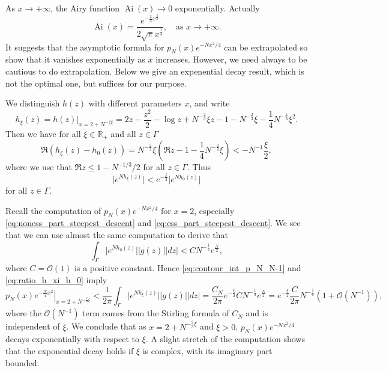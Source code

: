 \documentclass[11pt, a4paper]{article}
\numberwithin{equation}{section}
\newcommand{\bigO}{\mathcal{O}}
\newcommand{\realR}{\mathbb{R}}
\DeclareMathOperator{\Ai}{Ai}
\theoremstyle{definition}
\theoremstyle{remark}
\begin{document}
As $x \to +\infty$, the Airy function $\Ai(x) \to 0$ exponentially. Actually
\begin{equation}
  \Ai(x) = \frac{e^{-\frac{2}{3} x^{\frac{3}{2}}}}{2 \sqrt{\pi} x^{\frac{1}{4}}}, \quad \text{as $x \to +\infty$}.
\end{equation}
It suggests that the asymptotic formula for $p_N(x) e^{-Nx^2/4}$ can be extrapolated so show that it vanishes exponentially as $x$ increases. However, we need always to be cautious to do extrapolation. Below we give an expenential decay result, which is not the optimal one, but suffices for our purpose.

We distinguish $h(z)$ with different parameters $x$, and write
\begin{equation}
  h_{\xi}(z) = \left. h(z) \right\rvert_{x = 2 + N^{-\frac{2}{3} \xi}} = 2z - \frac{z^2}{2} - \log z + N^{-\frac{2}{3}} \xi z - 1 - N^{-\frac{2}{3}} \xi - \frac{1}{4} N^{-\frac{4}{3}} \xi^2.
\end{equation}
Then we have for all $\xi \in \realR_+$ and all $z \in \Gamma$
\begin{equation}
  \Re(h_{\xi}(z) - h_0(z)) = N^{-\frac{2}{3}} \xi \left( \Re z - 1 - \frac{1}{4} N^{-\frac{2}{3}} \xi \right) < -N^{-1} \frac{\xi}{2},
\end{equation}
where we use that $\Re z \leq 1 - N^{-1/3}/2$ for all $z \in \Gamma$. Thus
\begin{equation} \label{eq:ratio_h_xi_h_0}
  \lvert e^{N h_{\xi}(z)} \rvert < e^{-\frac{\xi}{2}} \lvert e^{N h_0(z)} \rvert
\end{equation}
for all $z \in \Gamma$.

Recall the computation of $p_N(x) e^{-Nx^2/4}$ for $x = 2$, especially \eqref{eq:noness_part_steepest_descent} and \eqref{eq:ess_part_steepest_descent}. We see that we can use almost the same computation to derive that
\begin{equation}
  \int_{\Gamma} \lvert e^{N h_0(z)} \rvert \lvert g(z) \rvert \lvert dz \rvert < C N^{-\frac{1}{3}} e^{\frac{N}{2}},
\end{equation}
where $C = \bigO(1)$ is a positive constant. Hence \eqref{eq:contour_int_p_N_N-1} and \eqref{eq:ratio_h_xi_h_0} imply
\begin{equation}
  \left. p_N(x) e^{-\frac{N}{4}x^2} \right\rvert_{x = 2 + N^{-\frac{2}{3} \xi}} < \frac{1}{2\pi} \int_{\Gamma} \lvert e^{N h_{\xi}(z)} \rvert \lvert g(z) \rvert \lvert dz \rvert = \frac{C_N}{2\pi} e^{-\frac{\xi}{2}} C N^{-\frac{1}{3}} e^{\frac{N}{2}} = e^{-\frac{\xi}{2}} \frac{C}{2\pi} N^{-\frac{1}{6}} (1 + \bigO(N^{-1})),
\end{equation}
where the $\bigO(N^{-1})$ term comes from the Stirling formula of $C_N$ and is independent of $\xi$. We conclude that as $x = 2 + N^{-\frac{2}{3} \xi}$ and $\xi > 0$, $p_N(x) e^{-Nx^2/4}$ decays exponentially with respect to $\xi$. A slight stretch of the computation shows that the exponential decay holds if $\xi$ is complex, with its imaginary part bounded.
\end{document}
